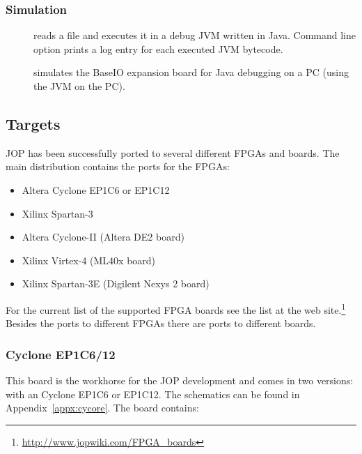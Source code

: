 \subsubsection{Simulation}

\begin{description}
    \item[] reads a  file and executes it in
    a debug JVM written in Java. Command line option
     prints a log entry for each executed JVM
    bytecode.
    \item[] simulates the BaseIO expansion board for Java
    debugging on a PC (using the JVM on the PC).
\end{description}

\subsection{Targets}

JOP has been successfully ported to several different FPGAs and
boards. The main distribution contains the ports for the FPGAs:

\begin{itemize}
    \item Altera Cyclone EP1C6 or EP1C12
    \item Xilinx Spartan-3
    \item Altera Cyclone-II (Altera DE2 board)
    \item Xilinx Virtex-4 (ML40x board)
    \item Xilinx Spartan-3E (Digilent Nexys 2 board)
\end{itemize}

For the current list of the supported FPGA boards see the list at the
web site.\footnote{\url{http://www.jopwiki.com/FPGA_boards}} Besides
the ports to different FPGAs there are ports to different boards.

\subsubsection{Cyclone EP1C6/12}

This board is the workhorse for the JOP development and comes in two
versions: with an Cyclone EP1C6 or EP1C12. The schematics can be
found in Appendix~\ref{appx:cycore}. The board contains:

